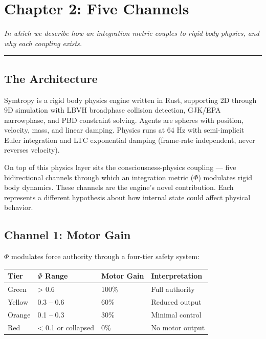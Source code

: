 \chapter{Chapter 2: Five Channels}\label{chapter-2-five-channels}

\emph{In which we describe how an integration metric couples to rigid body physics, and why each coupling exists.}

\begin{center}\rule{0.5\linewidth}{0.5pt}\end{center}

\section{The Architecture}\label{the-architecture}

Symtropy is a rigid body physics engine written in Rust, supporting 2D through 9D simulation with LBVH broadphase collision detection, GJK/EPA narrowphase, and PBD constraint solving. Agents are spheres with position, velocity, mass, and linear damping. Physics runs at 64 Hz with semi-implicit Euler integration and LTC exponential damping (frame-rate independent, never reverses velocity).

On top of this physics layer sits the consciousness-physics coupling --- five bidirectional channels through which an integration metric ($\Phi$) modulates rigid body dynamics. These channels are the engine's novel contribution. Each represents a different hypothesis about how internal state could affect physical behavior.

\section{Channel 1: Motor Gain}\label{channel-1-motor-gain}

$\Phi$ modulates force authority through a four-tier safety system:

\begin{longtable}[]{@{}llll@{}}
\toprule\noalign{}
Tier & $\Phi$ Range & Motor Gain & Interpretation \\
\midrule\noalign{}
\endhead
\bottomrule\noalign{}
\endlastfoot
Green & \textgreater{} 0.6 & 100\% & Full authority \\
Yellow & 0.3 -- 0.6 & 60\% & Reduced output \\
Orange & 0.1 -- 0.3 & 30\% & Minimal control \\
Red & \textless{} 0.1 or collapsed & 0\% & No motor output \\
\end{longtable}

